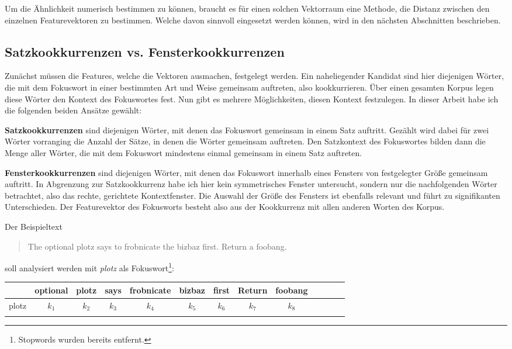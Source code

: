 \documentclass[11pt,numbers=noenddot]{scrartcl}
\begin{document}
Um die Ähnlichkeit numerisch bestimmen zu können, braucht es für einen solchen Vektorraum eine Methode, die Distanz zwischen den einzelnen Featurevektoren zu bestimmen. Welche davon sinnvoll eingesetzt werden können, wird in den nächsten Abschnitten beschrieben.

\subsection{Satzkookkurrenzen vs. Fensterkookkurrenzen}

Zunächst müssen die Features, welche die Vektoren ausmachen, festgelegt werden. Ein naheliegender Kandidat sind hier diejenigen Wörter, die mit dem Fokuswort in einer bestimmten Art und Weise gemeinsam auftreten, also kookkurrieren. Über einen gesamten Korpus legen diese Wörter den Kontext des Fokuswortes fest. Nun gibt es mehrere Möglichkeiten, diesen Kontext festzulegen. In dieser Arbeit habe ich die folgenden beiden Ansätze gewählt:

\textbf{Satzkookkurrenzen} sind diejenigen Wörter, mit denen das Fokuswort gemeinsam in einem Satz auftritt. Gezählt wird dabei für zwei Wörter vorranging die Anzahl der Sätze, in denen die Wörter gemeinsam auftreten. Den Satzkontext des Fokuswortes bilden dann die Menge aller Wörter, die mit dem Fokuswort mindestens einmal gemeinsam in einem Satz auftreten.

\textbf{Fensterkookkurrenzen} sind diejenigen Wörter, mit denen das Fokuswort innerhalb eines Fensters von festgelegter Größe gemeinsam auftritt. In Abgrenzung zur Satzkookkurrenz habe ich hier kein symmetrisches Fenster untersucht, sondern nur die nachfolgenden Wörter betrachtet, also das rechte, gerichtete Kontextfenster. Die Auswahl der Größe des Fensters ist ebenfalls relevant und führt zu signifikanten Unterschieden. Der Featurevektor des Fokusworts besteht also aus der Kookkurrenz mit allen anderen Worten des Korpus.

\noindent Der Beispieltext
\begin{quote}
    The optional plotz says to frobnicate the bizbaz first. Return a foobang.
\end{quote}
soll analysiert werden mit \emph{plotz} als Fokuswort\footnote{Stopwords wurden bereits entfernt.}:

\begin{table}[h]
    \begin{center}
        \begin{tabular}{ l | *{12}{c}}
                 & optional & plotz & says & frobnicate & bizbaz & first & Return & foobang \\ \hline
            plotz & $k_{1}$ & $k_{2}$ & $k_{3}$ & $k_{4}$ & $k_{5}$ & $k_{6}$ & $k_{7}$ & $k_{8}$ \\ \\
        \end{tabular}
    \end{center}
\end{table}
\end{document}

